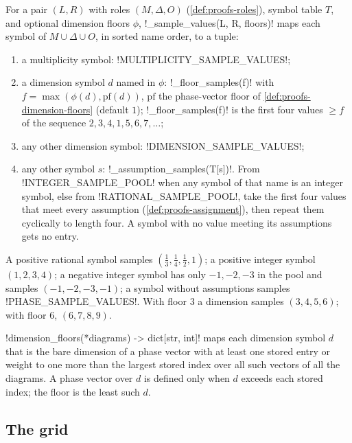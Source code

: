 \begin{definition}\label{def:proofs-sample-values}
For a pair $(L,R)$ with roles $(M,\Delta,O)$ (\cref{def:proofs-roles}), symbol table $T$, and optional dimension floors $\phi$, \py!_sample_values(L, R, floors)! maps each symbol of $M\cup\Delta\cup O$, in sorted name order, to a tuple:
\begin{enumerate}
\item a multiplicity symbol: \py!MULTIPLICITY_SAMPLE_VALUES!;
\item a dimension symbol $d$ named in $\phi$: \py!_floor_samples(f)! with $f=\max(\phi(d),\text{pf}(d))$, $\text{pf}$ the phase-vector floor of \cref{def:proofs-dimension-floors} (default $1$); \py!_floor_samples(f)! is the first four values $\ge f$ of the sequence $2,3,4,1,5,6,7,\ldots$;
\item any other dimension symbol: \py!DIMENSION_SAMPLE_VALUES!;
\item any other symbol $s$: \py!_assumption_samples(T[s])!. From \py!INTEGER_SAMPLE_POOL! when any symbol of that name is an integer symbol, else from \py!RATIONAL_SAMPLE_POOL!, take the first four values that meet every assumption (\cref{def:proofs-assignment}), then repeat them cyclically to length four. A symbol with no value meeting its assumptions gets no entry.
\end{enumerate}
\end{definition}

\begin{example}
A positive rational symbol samples $(\tfrac13,\tfrac14,\tfrac12,1)$; a positive integer symbol $(1,2,3,4)$; a negative integer symbol has only $-1,-2,-3$ in the pool and samples $(-1,-2,-3,-1)$; a symbol without assumptions samples \py!PHASE_SAMPLE_VALUES!. With floor $3$ a dimension samples $(3,4,5,6)$; with floor $6$, $(6,7,8,9)$.
\end{example}

\begin{definition}\label{def:proofs-dimension-floors}
\py!dimension_floors(*diagrams) -> dict[str, int]! maps each dimension symbol $d$ that is the bare dimension of a phase vector with at least one stored entry or weight to one more than the largest stored index over all such vectors of all the diagrams. A phase vector over $d$ is defined only when $d$ exceeds each stored index; the floor is the least such $d$.
\end{definition}

\subsection{The grid}

